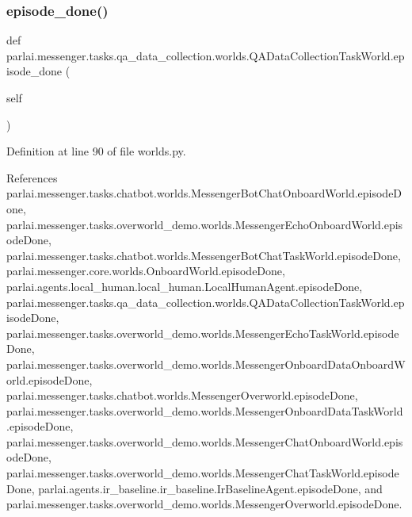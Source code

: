 \subsubsection{\texorpdfstring{episode\+\_\+done()}{episode\_done()}}
{\footnotesize\ttfamily def parlai.\+messenger.\+tasks.\+qa\+\_\+data\+\_\+collection.\+worlds.\+Q\+A\+Data\+Collection\+Task\+World.\+episode\+\_\+done (\begin{DoxyParamCaption}\item[{}]{self }\end{DoxyParamCaption})}



Definition at line 90 of file worlds.\+py.



References parlai.\+messenger.\+tasks.\+chatbot.\+worlds.\+Messenger\+Bot\+Chat\+Onboard\+World.\+episode\+Done, parlai.\+messenger.\+tasks.\+overworld\+\_\+demo.\+worlds.\+Messenger\+Echo\+Onboard\+World.\+episode\+Done, parlai.\+messenger.\+tasks.\+chatbot.\+worlds.\+Messenger\+Bot\+Chat\+Task\+World.\+episode\+Done, parlai.\+messenger.\+core.\+worlds.\+Onboard\+World.\+episode\+Done, parlai.\+agents.\+local\+\_\+human.\+local\+\_\+human.\+Local\+Human\+Agent.\+episode\+Done, parlai.\+messenger.\+tasks.\+qa\+\_\+data\+\_\+collection.\+worlds.\+Q\+A\+Data\+Collection\+Task\+World.\+episode\+Done, parlai.\+messenger.\+tasks.\+overworld\+\_\+demo.\+worlds.\+Messenger\+Echo\+Task\+World.\+episode\+Done, parlai.\+messenger.\+tasks.\+overworld\+\_\+demo.\+worlds.\+Messenger\+Onboard\+Data\+Onboard\+World.\+episode\+Done, parlai.\+messenger.\+tasks.\+chatbot.\+worlds.\+Messenger\+Overworld.\+episode\+Done, parlai.\+messenger.\+tasks.\+overworld\+\_\+demo.\+worlds.\+Messenger\+Onboard\+Data\+Task\+World.\+episode\+Done, parlai.\+messenger.\+tasks.\+overworld\+\_\+demo.\+worlds.\+Messenger\+Chat\+Onboard\+World.\+episode\+Done, parlai.\+messenger.\+tasks.\+overworld\+\_\+demo.\+worlds.\+Messenger\+Chat\+Task\+World.\+episode\+Done, parlai.\+agents.\+ir\+\_\+baseline.\+ir\+\_\+baseline.\+Ir\+Baseline\+Agent.\+episode\+Done, and parlai.\+messenger.\+tasks.\+overworld\+\_\+demo.\+worlds.\+Messenger\+Overworld.\+episode\+Done.

\mbox{\label{classparlai_1_1messenger_1_1tasks_1_1qa__data__collection_1_1worlds_1_1QADataCollectionTaskWorld_a5d78edfdf7dc7ccf8480f778c2d02c77}} 
